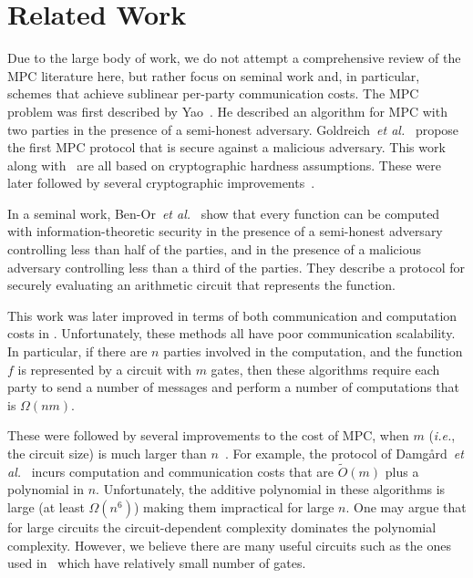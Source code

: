 \documentclass[11pt,letter]{article}
\newcommand{\ie}{\emph{i.e.}}
\newcommand{\etal}{\emph{et al.}}
\theoremstyle{mytheoremstyle}
\begin{document}
\section{Related Work} \label{sec:relatedwork}
Due to the large body of work, we do not attempt a comprehensive review of the MPC literature here, but rather focus on seminal work and, in particular, schemes that achieve sublinear per-party communication costs.
The MPC problem was first described by Yao~\cite{Yao:1982:PSC:1382436.1382751}. He described an algorithm for MPC with two parties in the presence of a semi-honest adversary. Goldreich~\etal~\cite{Goldreich:1987:PAM:28395.28420} propose the first MPC protocol that is secure against a malicious adversary. This work along with~\cite{Chaum:1987:MCE:646752.704756,Galil:1987:CCS:646752.704741} are all based on cryptographic hardness assumptions. These were later followed by several cryptographic improvements~\cite{Beaver:1990:RCS:100216.100287,Gennaro:1998:SVF:277697.277716,Canetti:1996:ASM:888604}.

In a seminal work, Ben-Or~\etal~\cite{bgw88} show that every function can be computed with information-theoretic security in the presence of a semi-honest adversary controlling less than half of the parties, and in the presence of a malicious adversary controlling less than a third of the parties. They describe a protocol for securely evaluating an arithmetic circuit that represents the function. 

This work was later improved in terms of both communication and computation costs in \cite{chaum_crepeau_damgard:multiparty,Beaver:1991,Gennaro:1998:SVF:277697.277716}. Unfortunately, these methods all have poor communication scalability. In particular, if there are $n$ parties involved in the computation, and the function $f$ is represented by a circuit with $m$ gates, then these algorithms require each party to send a number of messages and perform a number of computations that is $\Omega(nm)$.

These were followed by several improvements to the cost of MPC, when $m$ (\ie, the circuit size) is much larger than $n$~\cite{damgard2006scalable,damgard2007scalable,damgard2008scalable}. For example, the protocol of Damg{\aa}rd~\etal~\cite{damgard2008scalable} incurs computation and communication costs that are $\tilde{O}(m)$ plus a polynomial in $n$. Unfortunately, the additive polynomial in these algorithms is large (at least $\Omega(n^{6})$) making them impractical for large $n$. One may argue that for large circuits the circuit-dependent complexity dominates the polynomial complexity. However, we believe there are many useful circuits such as the ones used in~\cite{msz:sirocco:2015,Hamada:2012:MPCSorting} which have relatively small number of gates.
\end{document}
